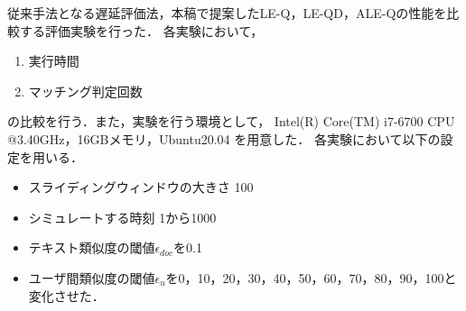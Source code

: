 従来手法となる遅延評価法，本稿で提案したLE-Q，LE-QD，ALE-Qの性能を比較する評価実験を行った．
各実験において，
\begin{enumerate}
    \item 実行時間
    \item マッチング判定回数
\end{enumerate}
の比較を行う．また，実験を行う環境として，
Intel(R) Core(TM) i7-6700 CPU @3.40GHz，16GBメモリ，Ubuntu20.04
を用意した．
各実験において以下の設定を用いる．
\begin{itemize}
    \item スライディングウィンドウの大きさ 100
    \item シミュレートする時刻 1から1000
    \item テキスト類似度の閾値$\epsilon_{doc}$を0.1
    \item ユーザ間類似度の閾値$\epsilon_u$を0，10，20，30，40，50，60，70，80，90，100と変化させた．
\end{itemize}

